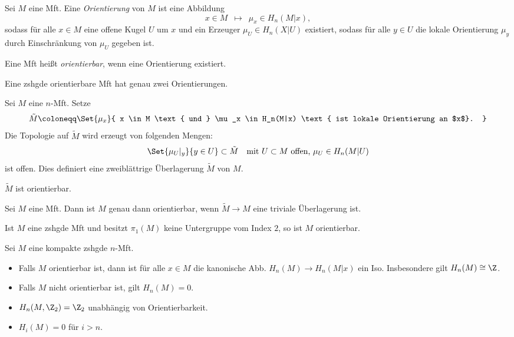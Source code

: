 \documentclass{cheat-sheet}
\newcommand{\ZM}[1]{\Z_{#1}} %
\begin{document}

\begin{defn}
  Sei $M$ eine Mft. Eine \emph{Orientierung} von $M$ ist eine Abbildung
  \[ x \in M \enspace\mapsto\enspace \mu_x \in H_n(M|x), \]
  sodass für alle $x \in M$ eine offene Kugel $U$ um $x$ und ein Erzeuger $\mu_U \in H_n(X|U)$ existiert, sodass für alle $y \in U$ die lokale Orientierung $\mu_y$ durch Einschränkung von $\mu_U$ gegeben ist.
\end{defn}

\begin{defn}
  Eine Mft heißt \emph{orientierbar}, wenn eine Orientierung existiert.
\end{defn}

\begin{prop}
  Eine zshgde orientierbare Mft hat genau zwei Orientierungen.
\end{prop}


\begin{defn}
  Sei $M$ eine $n$-Mft. Setze
  \[ \tilde{M} \coloneqq \Set{ \mu_x }{ x \in M \text{ und } \mu_x \in H_n(M|x) \text{ ist lokale Orientierung an $x$}. } \]
  Die Topologie auf $\tilde{M}$ wird erzeugt von folgenden Mengen:
  \[
    \Set{ \mu_U|_y }{ y \in U } \subset \tilde{M}
    \quad \text{mit $U \subset M$ offen, $\mu_U \in H_n(M|U)$}
  \]
  ist offen. Dies definiert eine zweiblättrige Überlagerung $\tilde{M}$ von $M$.
\end{defn}

\begin{prop}
  $\tilde{M}$ ist orientierbar.
\end{prop}

\begin{prop}
  Sei $M$ eine Mft. Dann ist $M$ genau dann orientierbar, wenn $\tilde{M} \to M$ eine triviale Überlagerung ist.
\end{prop}

\begin{kor}
  Ist $M$ eine zshgde Mft und besitzt $\pi_1(M)$ keine Untergruppe vom Index $2$, so ist $M$ orientierbar.
\end{kor}

\begin{prop}
  Sei $M$ eine kompakte zshgde $n$-Mft.
  \begin{itemize}
    \item Falls $M$ orientierbar ist, dann ist für alle $x \in M$ die kanonische Abb. $H_n(M) \to H_n(M|x)$ ein Iso. Insbesondere gilt $H_n(M) \cong \Z$.
    \item Falls $M$ nicht orientierbar ist, gilt $H_n(M) = 0$.
    \item $H_n(M, \ZM{2}) = \ZM{2}$ unabhängig von Orientierbarkeit.
    \item $H_i(M) = 0$ für $i > n$.
  \end{itemize}
\end{prop}
\end{document}
